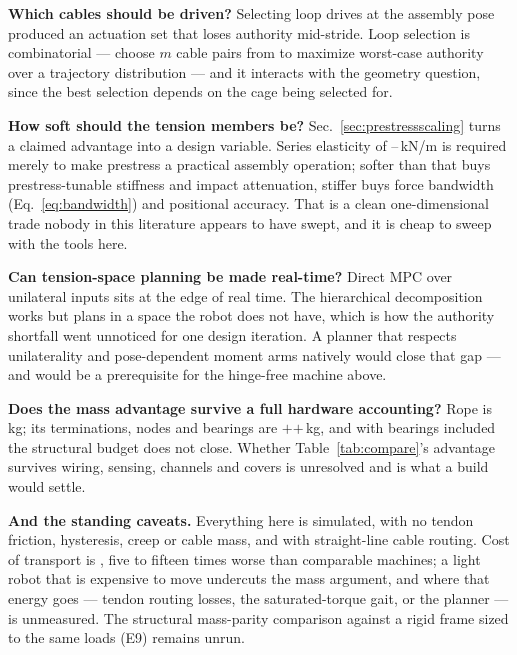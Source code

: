 \documentclass[conference]{IEEEtran}
\begin{document}
\textbf{Which cables should be driven?} Selecting loop drives at the assembly
pose produced an actuation set that loses authority mid-stride. Loop selection
is combinatorial --- choose $m$ cable pairs from \numActuatable{} to maximize
worst-case authority over a trajectory distribution --- and it interacts with
the geometry question, since the best selection depends on the cage being
selected for.

\textbf{How soft should the tension members be?} Sec.~\ref{sec:prestressscaling}
turns a claimed advantage into a design variable. Series elasticity of
\kSeriesMin--\kSeriesMax\,kN/m is required merely to make prestress a practical
assembly operation; softer than that buys prestress-tunable stiffness and
impact attenuation, stiffer buys force bandwidth (Eq.~\ref{eq:bandwidth}) and
positional accuracy. That is a clean one-dimensional trade nobody in this
literature appears to have swept, and it is cheap to sweep with the tools here.

\textbf{Can tension-space planning be made real-time?} Direct MPC over
\numActuatable{} unilateral inputs sits at the edge of real time. The
hierarchical decomposition works but plans in a space the robot does not have,
which is how the authority shortfall went unnoticed for one design iteration.
A planner that respects unilaterality and pose-dependent moment arms natively
would close that gap --- and would be a prerequisite for the hinge-free machine
above.

\textbf{Does the mass advantage survive a full hardware accounting?} Rope is
\ropeMass\,kg; its terminations, nodes and bearings are
\termMass$+$\nodeMass$+$\bearingMass\,kg, and with bearings included the
structural budget does not close. Whether Table~\ref{tab:compare}'s advantage
survives wiring, sensing, channels and covers is unresolved and is what a build
would settle.

\textbf{And the standing caveats.} Everything here is simulated, with no tendon
friction, hysteresis, creep or cable mass, and with straight-line cable
routing. Cost of transport is \walkCot{}, five to fifteen times worse than
comparable machines; a light robot that is expensive to move undercuts the mass
argument, and where that energy goes --- tendon routing losses, the
saturated-torque gait, or the planner --- is unmeasured. The structural
mass-parity comparison against a rigid frame sized to the same loads (E9)
remains unrun.
\end{document}

